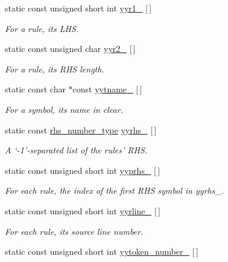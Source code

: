 \begin{DoxyCompactItemize}
static const unsigned short int \hyperlink{classyy_1_1_parser_implementation_aa661efe49894e54f8e0640ca5081174e}{yyr1\_\-} \mbox{[}$\,$\mbox{]}
\begin{DoxyCompactList}\small\item\em For a rule, its LHS. \end{DoxyCompactList}\item 
static const unsigned char \hyperlink{classyy_1_1_parser_implementation_aae8701b08b3bcbe1a1aecf3c49f22cc1}{yyr2\_\-} \mbox{[}$\,$\mbox{]}
\begin{DoxyCompactList}\small\item\em For a rule, its RHS length. \end{DoxyCompactList}\item 
static const char $\ast$const \hyperlink{classyy_1_1_parser_implementation_a8dfff626efe4501693236fe9fa986990}{yytname\_\-} \mbox{[}$\,$\mbox{]}
\begin{DoxyCompactList}\small\item\em For a symbol, its name in clear. \end{DoxyCompactList}\item 
static const \hyperlink{classyy_1_1_parser_implementation_a8560d05133a5d38235df7281ddf0a494}{rhs\_\-number\_\-type} \hyperlink{classyy_1_1_parser_implementation_a6e4c8b6a53433c156356fb91fc929e19}{yyrhs\_\-} \mbox{[}$\,$\mbox{]}
\begin{DoxyCompactList}\small\item\em A `-\/1'-\/separated list of the rules' RHS. \end{DoxyCompactList}\item 
static const unsigned short int \hyperlink{classyy_1_1_parser_implementation_ae77c38fbf199fdd9cd84059607af0704}{yyprhs\_\-} \mbox{[}$\,$\mbox{]}
\begin{DoxyCompactList}\small\item\em For each rule, the index of the first RHS symbol in {\itshape yyrhs\_\-\/}. \end{DoxyCompactList}\item 
static const unsigned short int \hyperlink{classyy_1_1_parser_implementation_a4cede2ed2e3453c568199b63672fa746}{yyrline\_\-} \mbox{[}$\,$\mbox{]}
\begin{DoxyCompactList}\small\item\em For each rule, its source line number. \end{DoxyCompactList}\item 
static const unsigned short int \hyperlink{classyy_1_1_parser_implementation_a9b7ed8857471d6f1fe03d524f1aae6a5}{yytoken\_\-number\_\-} \mbox{[}$\,$\mbox{]}

\end{DoxyCompactItemize}
